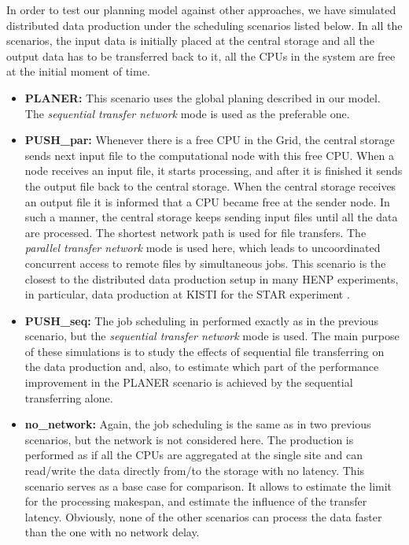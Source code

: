 \documentclass{svjour3}                     %
\begin{document}
In order to test our planning model against other approaches, we have simulated distributed data production under the scheduling scenarios listed below. In all the scenarios, the input data is initially placed at the central storage and all the output data has to be transferred back to it, all the CPUs in the system are free at the initial moment of time.
\begin{itemize}
\label{scenarios}
\item \textbf{PLANER:}  This scenario uses the global planing described in our model. The \textit{sequential transfer network} mode is used as the preferable one. 
\item \textbf{PUSH\_par:} Whenever there is a free CPU in the Grid, the central storage sends next input file to the computational node with this free CPU. When a node receives an input file, it starts processing, and after it is finished it sends the output file back to the central storage. When the central storage receives an output file it is informed that a CPU became free at the sender node. In such a manner, the central storage keeps sending input files until all the data are processed. The shortest network path is used for file transfers. The \textit{parallel transfer network} mode is used here, which leads to uncoordinated concurrent access to remote files by simultaneous jobs. This scenario is the closest to the distributed data production setup in many HENP experiments, in particular, data production at KISTI for the STAR experiment \cite{KISTI-production}. 
\item \textbf{PUSH\_seq:} The job scheduling in performed exactly as in the previous scenario, but the \textit{sequential transfer network} mode is used. The main purpose of these simulations is to study the effects of sequential file transferring on the data production and, also, to estimate which part of the performance improvement in the PLANER scenario is achieved by the sequential transferring alone.
\item \textbf{no\_network:} Again, the job scheduling is the same as in two previous scenarios, but the network is not considered here. The production is performed as if all the CPUs are aggregated at the single site and can read/write the data directly from/to the storage with no latency. This scenario serves as a base case for comparison. It allows to estimate the limit for the processing makespan, and estimate the influence of the transfer latency. Obviously, none of the other scenarios can process the data faster than the one with no network delay.
\end{itemize}
\end{document}
